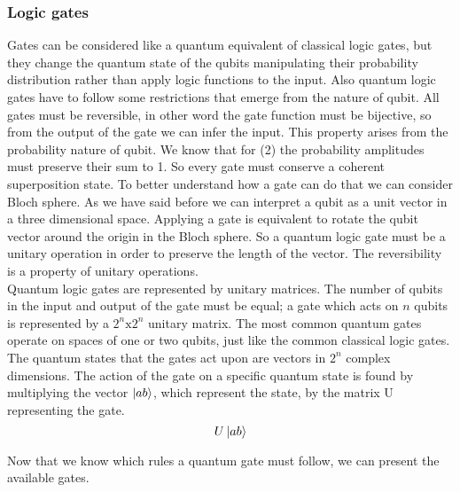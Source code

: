 \documentclass[main.tex]{subfiles}
\begin{document}
	\subsubsection{Logic gates}Gates can be considered like a quantum equivalent of classical logic gates, but they change the 
	quantum state of the qubits manipulating their probability distribution rather than apply logic functions to the input. 
	Also quantum logic gates have to follow some restrictions that emerge from the nature of qubit. All gates must be 
	reversible, in other word the gate function must be	bijective, so from the output of the gate we can infer the input.
	This property arises from the probability nature of qubit. We know that for (2) the probability amplitudes must preserve their
	sum to 1. So every gate must conserve a coherent superposition state. To better understand how a gate can do that we can consider
	Bloch sphere. As we have said before we can interpret a qubit as a unit vector in a three dimensional space. Applying a gate is 
	equivalent to rotate the qubit vector around the origin in the Bloch sphere. So a quantum logic gate must be a unitary operation 
	in order to preserve the length of the vector. The reversibility is a property of unitary operations.\\
	
	Quantum logic gates are represented by unitary matrices. The number of qubits in the input and output of the gate must be 
	equal; a gate which acts on $n$ qubits is represented by a $2^n\text{x}2^n$ unitary matrix. The most common quantum gates operate on 
	spaces of one or two qubits, just like the common classical logic gates. The quantum states that the gates act upon are vectors 
	in $2^n$ complex dimensions. The action of the gate on a specific quantum state is found by multiplying 
	the vector $\ket{ab}$, which represent the state, by the matrix U representing the gate.
	\begin{equation}
	U\ket{ab}
	\end{equation}
	
	Now that we know which rules a quantum gate must follow, we can present the available gates.
\end{document}
